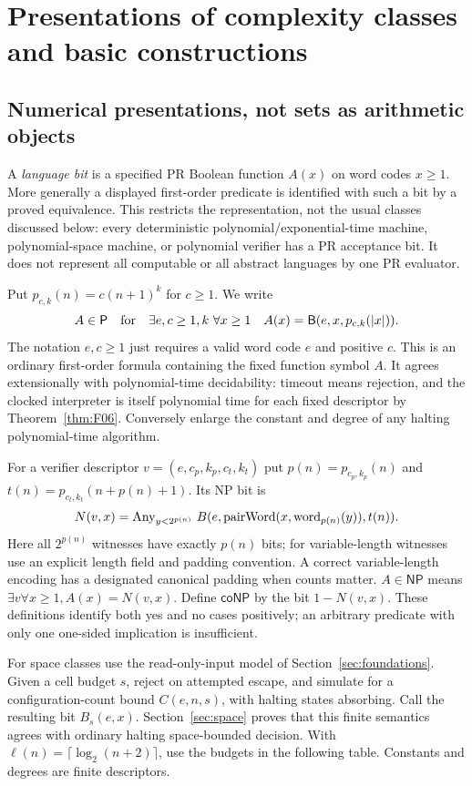 \section{Presentations of complexity classes and basic constructions}
\label{sec:classes}

\subsection{Numerical presentations, not sets as arithmetic objects}
A \emph{language bit} is a specified PR Boolean function $A(x)$ on word codes $x\ge1$. More generally a displayed first-order predicate is identified with such a bit by a proved equivalence. This restricts the representation, not the usual classes discussed below: every deterministic polynomial/exponential-time machine, polynomial-space machine, or polynomial verifier has a PR acceptance bit. It does not represent all computable or all abstract languages by one PR evaluator.

Put $p_{c,k}(n)=c(n+1)^k$ for $c\ge1$. We write
\[
 A\in\mathsf P\quad\text{for}\quad
 \exists e,c\ge1,k\ \forall x\ge1\quad
 A(x)=\mathsf B(e,x,p_{c,k}(|x|)).
\]
The notation $e,c\ge1$ just requires a valid word code $e$ and positive $c$. This is an ordinary first-order formula containing the fixed function symbol $A$. It agrees extensionally with polynomial-time decidability: timeout means rejection, and the clocked interpreter is itself polynomial time for each fixed descriptor by Theorem~\ref{thm:F06}. Conversely enlarge the constant and degree of any halting polynomial-time algorithm.

For a verifier descriptor $v=(e,c_p,k_p,c_t,k_t)$ put $p(n)=p_{c_p,k_p}(n)$ and $t(n)=p_{c_t,k_t}(n+p(n)+1)$. Its NP bit is
\[
 N(v,x)=\operatorname{Any}_{y<2^{p(n)}}\,B(e,\operatorname{pairWord}(x,\operatorname{word}_{p(n)}(y)),t(n)).
\]
Here all $2^{p(n)}$ witnesses have exactly $p(n)$ bits; for variable-length witnesses use an explicit length field and padding convention. A correct variable-length encoding has a designated canonical padding when counts matter. $A\in\mathsf{NP}$ means $\exists v\forall x\ge1, A(x)=N(v,x)$. Define $\mathsf{coNP}$ by the bit $1-N(v,x)$. These definitions identify both yes and no cases positively; an arbitrary predicate with only one one-sided implication is insufficient.

For space classes use the read-only-input model of Section~\ref{sec:foundations}. Given a cell budget $s$, reject on attempted escape, and simulate for a configuration-count bound $C(e,n,s)$, with halting states absorbing. Call the resulting bit $B_s(e,x)$. Section~\ref{sec:space} proves that this finite semantics agrees with ordinary halting space-bounded decision. With $\ell(n)=\lceil\log_2(n+2)\rceil$, use the budgets in the following table. Constants and degrees are finite descriptors.

